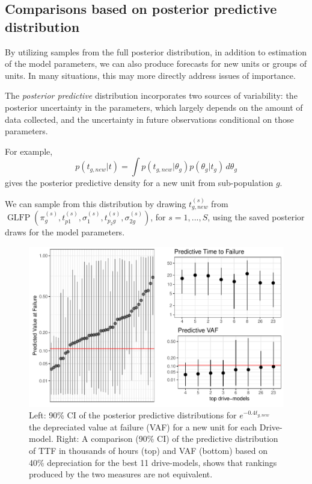\documentclass[11pt]{article}
\begin{document}
 
 



\subsection{Comparisons based on posterior predictive distribution}
By utilizing samples from the full posterior distribution, in addition to estimation of the model parameters, we can also produce forecasts for new units or groups of units. In many situations, this may more directly address issues of importance.

The {\em posterior predictive} distribution incorporates two sources of variability: the posterior uncertainty in the parameters, which largely depends on the
amount of data collected, and the uncertainty in future
observations conditional on those parameters. 

For example,
\begin{equation*}
  p(t_{g,new}|t) = \int p(t_{g,new}|\theta_g) p(\theta_g|t_g) \, d\theta_g
\end{equation*}
gives the posterior predictive density for a new unit from sub-population $g$.

We can sample from this distribution by drawing $t_{g,new}^{(s)}$ from
$\operatorname{GLFP}(\pi_g^{(s)},
t_{p1}^{(s)},\sigma_1^{(s)},t_{p_{2}g}^{(s)},\sigma_{2g}^{(s)})$, for
$s=1,...,S$, using the saved posterior draws for the model
parameters. 

\begin{figure}[H]
  \centering
  \includegraphics[width=.8\textwidth]{dm-eval}
  \caption{\footnotesize Left: 90\% CI of the posterior predictive distributions for $e^{-0.4 t_{g,new}}$ the depreciated value at failure (VAF) for a new unit for each Drive-model.
  Right: A comparison (90\% CI) of the predictive distribution of TTF in thousands of hours (top) and VAF (bottom) based on 40\% depreciation for the best 11 drive-models, shows that rankings produced by the two measures are not equivalent.}
  \label{fig5}
\end{figure}
\end{document}
